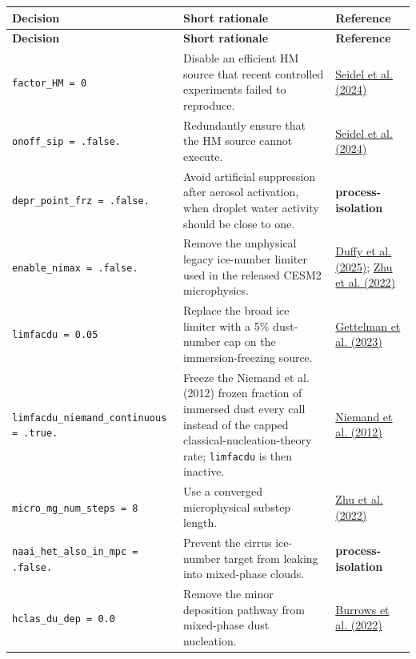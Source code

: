 \label{tab:sppe-namelist-decisions}
\begin{longtable}{@{}>{\raggedright\arraybackslash}p{}>{\raggedright\arraybackslash}p{}>{\raggedright\arraybackslash}p{}@{}}
\toprule
\textbf{Decision} & \textbf{Short rationale} & \textbf{Reference} \\
\midrule
\endfirsthead
\toprule
\textbf{Decision} & \textbf{Short rationale} & \textbf{Reference} \\
\midrule
\endhead
\texttt{factor\_HM = 0} & Disable an efficient HM source that recent controlled experiments failed to reproduce. & \href{https://doi.org/10.5194/acp-24-5247-2024}{Seidel et al. (2024)} \\
\texttt{onoff\_sip = .false.} & Redundantly ensure that the HM source cannot execute. & \href{https://doi.org/10.5194/acp-24-5247-2024}{Seidel et al. (2024)} \\
\texttt{depr\_point\_frz = .false.} & Avoid artificial suppression after aerosol activation, when droplet water activity should be close to one. & \textbf{process-isolation} \\
\texttt{enable\_nimax = .false.} & Remove the unphysical legacy ice-number limiter used in the released CESM2 microphysics. & \href{https://doi.org/10.1029/2025MS004967}{Duffy et al. (2025)}; \href{https://doi.org/10.1029/2021MS002776}{Zhu et al. (2022)} \\
\texttt{limfacdu = 0.05} & Replace the broad ice limiter with a 5\% dust-number cap on the immersion-freezing source. & \href{https://doi.org/10.5194/gmd-16-1735-2023}{Gettelman et al. (2023)} \\
\texttt{limfacdu\_niemand\_continuous = .true.} & Freeze the Niemand et al. (2012) frozen fraction of immersed dust every call instead of the capped classical-nucleation-theory rate; \texttt{limfacdu} is then inactive. & \href{https://doi.org/10.1175/JAS-D-11-0249.1}{Niemand et al. (2012)} \\
\texttt{micro\_mg\_num\_steps = 8} & Use a converged microphysical substep length. & \href{https://doi.org/10.1029/2021MS002776}{Zhu et al. (2022)} \\
\texttt{naai\_het\_also\_in\_mpc = .false.} & Prevent the cirrus ice-number target from leaking into mixed-phase clouds. & \textbf{process-isolation} \\
\texttt{hclas\_du\_dep = 0.0} & Remove the minor deposition pathway from mixed-phase dust nucleation. & \href{https://doi.org/10.1029/2021RG000745}{Burrows et al. (2022)} \\

\end{longtable}
